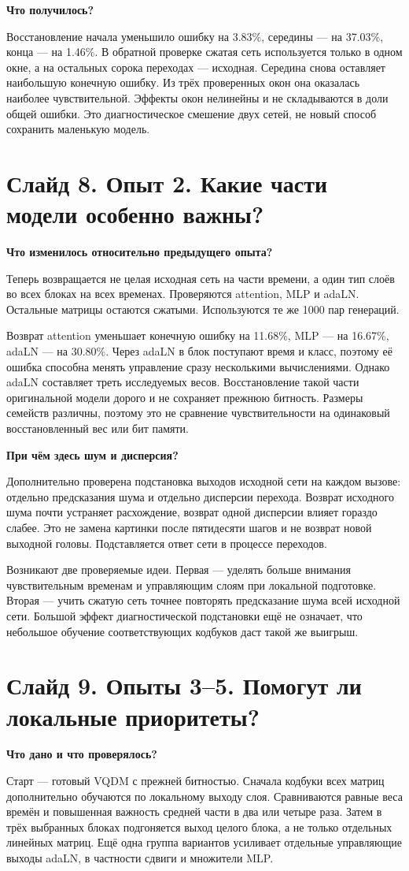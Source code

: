 \documentclass[a4paper,11pt]{article}
\newcommand{\slide}[2]{\clearpage\section*{Слайд #1. #2}}
\newcommand{\question}[1]{\par\textbf{#1}\par}
\begin{document}
\question{Что получилось?}
Восстановление начала уменьшило ошибку на 3.83\%, середины --- на 37.03\%,
конца --- на 1.46\%. В обратной проверке сжатая сеть используется только
в одном окне, а на остальных сорока переходах --- исходная. Середина снова
оставляет наибольшую конечную ошибку. Из трёх проверенных окон она оказалась
наиболее чувствительной. Эффекты окон нелинейны и не складываются в доли
общей ошибки. Это диагностическое смешение двух сетей, не новый способ
сохранить маленькую модель.

\slide{8}{Опыт 2. Какие части модели особенно важны?}
\question{Что изменилось относительно предыдущего опыта?}
Теперь возвращается не целая исходная сеть на части времени, а один тип
слоёв во всех блоках на всех временах. Проверяются attention, MLP и adaLN.
Остальные матрицы остаются сжатыми. Используются те же 1000 пар генераций.

Возврат attention уменьшает конечную ошибку на 11.68\%, MLP --- на 16.67\%,
adaLN --- на 30.80\%. Через adaLN в блок поступают время и класс, поэтому
её ошибка способна менять управление сразу несколькими вычислениями.
Однако adaLN составляет треть исследуемых весов. Восстановление такой
части оригинальной модели дорого и не сохраняет прежнюю битность.
Размеры семейств различны, поэтому это не сравнение чувствительности
на одинаковый восстановленный вес или бит памяти.

\question{При чём здесь шум и дисперсия?}
Дополнительно проверена подстановка выходов исходной сети на каждом вызове:
отдельно предсказания шума и отдельно дисперсии перехода. Возврат исходного
шума почти устраняет расхождение, возврат одной дисперсии влияет гораздо
слабее. Это не замена картинки после пятидесяти шагов и не возврат
новой выходной головы. Подставляется ответ сети в процессе переходов.

Возникают две проверяемые идеи. Первая --- уделять больше внимания
чувствительным временам и управляющим слоям при локальной подготовке.
Вторая --- учить сжатую сеть точнее повторять предсказание шума всей
исходной сети. Большой эффект диагностической подстановки ещё не означает,
что небольшое обучение соответствующих кодбуков даст такой же выигрыш.

\slide{9}{Опыты 3--5. Помогут ли локальные приоритеты?}
\question{Что дано и что проверялось?}
Старт --- готовый VQDM с прежней битностью. Сначала кодбуки всех матриц
дополнительно обучаются по локальному выходу слоя. Сравниваются равные веса
времён и повышенная важность средней части в два или четыре раза.
Затем в трёх выбранных блоках подгоняется выход целого блока, а не только
отдельных линейных матриц. Ещё одна группа вариантов усиливает отдельные
управляющие выходы adaLN, в частности сдвиги и множители MLP.
\end{document}
